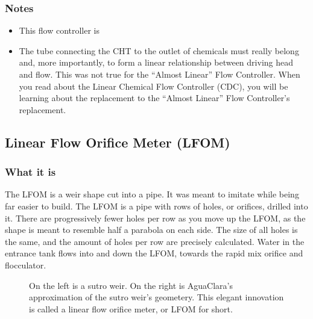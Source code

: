 \documentclass[letterpaper,10pt,english]{sphinxmanual}
\let\sphinxpxdimen\pdfpxdimen\else\newdimen\sphinxpxdimen
\begin{document}
\subsubsection{Notes}
\label{\detokenize{Flow_Control_and_Measurement/FCM_Design:notes}}\begin{itemize}
\item {} 
This flow controller is 

\item {} 
The tube connecting the CHT to the outlet of chemicals must really belong and, more importantly,  to form a linear relationship between driving head and flow. This was not true for the “Almost Linear” Flow Controller. When you read about the Linear Chemical Flow Controller (CDC), you will be learning about the replacement to the “Almost Linear” Flow Controller’s replacement.

\end{itemize}


\subsection{Linear Flow Orifice Meter (LFOM)}
\label{\detokenize{Flow_Control_and_Measurement/FCM_Design:linear-flow-orifice-meter-lfom}}\label{\detokenize{Flow_Control_and_Measurement/FCM_Design:heading-lfom}}

\subsubsection{What it is}
\label{\detokenize{Flow_Control_and_Measurement/FCM_Design:id1}}
The LFOM is a weir shape cut into a pipe. It was meant to imitate  while being far easier to build. The LFOM is a pipe with rows of holes, or orifices, drilled into it. There are progressively fewer holes per row as you move up the LFOM, as the shape is meant to resemble half a parabola on each side. The size of all holes is the same, and the amount of holes per row are precisely calculated. Water in the entrance tank flows into and down the LFOM, towards the rapid mix orifice and flocculator.

\begin{figure}[htbp]
\centering
\capstart

\noindent\sphinxincludegraphics[width=600\sphinxpxdimen]{{sutro_v_lfom}.png}
\caption{On the left is a sutro weir. On the right is AguaClara’s approximation of the sutro weir’s geometery. This elegant innovation is called a linear flow orifice meter, or LFOM for short.}\label{\detokenize{Flow_Control_and_Measurement/FCM_Design:id9}}\label{\detokenize{Flow_Control_and_Measurement/FCM_Design:figure-sutro-v-lfom}}\end{figure}
\end{document}
